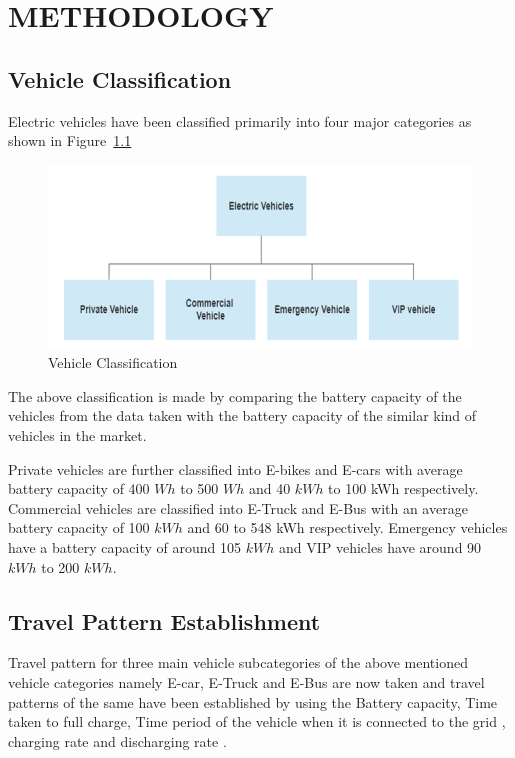 	\chapter{METHODOLOGY}
	\label{chap:methodology}
	
	\section{Vehicle Classification}
	
	 Electric vehicles have been classified primarily into four major categories as shown in Figure~\ref{fig:classification} 
	 	
			\begin{figure}[h]
				\centering
				\includegraphics[width=0.7\linewidth]{./Figures/classification}
				\caption{Vehicle Classification}
				\label{fig:classification}
			\end{figure}
		
	The above classification is made by comparing the battery capacity of the vehicles from the data taken with the battery capacity of the similar kind of vehicles in the market.

	\par {Private vehicles are further classified into E-bikes and E-cars with average battery capacity of 400 $Wh$ to 500 $Wh$ and 40 $kWh$ to 100 kWh respectively. Commercial vehicles are classified into E-Truck and E-Bus with an average battery capacity of 100 $kWh$ and 60 to 548 kWh respectively. Emergency vehicles have a battery capacity of around 105 $kWh$ and VIP vehicles have around 90 $kWh$ to 200 $kWh$.
	}
	
	\section{Travel Pattern Establishment}
	
	Travel pattern for three main vehicle subcategories of the above mentioned vehicle categories namely E-car, E-Truck and E-Bus are now taken and travel patterns of the same have been established by using the Battery capacity, Time taken to full charge, Time period of the vehicle when it is connected to the grid , charging rate and discharging rate \cite{evdata}.
	
